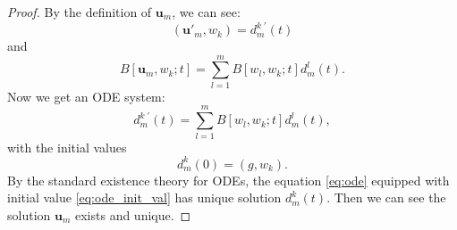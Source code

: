 \begin{proof}
    By the definition of $\mathbf{u}_{m}$, we can see:
    \begin{equation}
        \label{eq:ode_left}
        (\mathbf{u}'_{m},w_{k})=d_{m}^{k\;'}(t)
    \end{equation}
    and 
    \begin{equation}
        \label{eq:ode_right}
        B[\mathbf{u}_{m},w_{k};t]=\sum_{l=1}^{m}B[w_{l},w_{k};t]d_{m}^{l}(t).
    \end{equation}
    Now we get an ODE system:
    \begin{equation}
        \label{eq:ode}
        d_{m}^{k\;'}(t)=\sum_{l=1}^{m}B[w_{l},w_{k};t]d_{m}^{l}(t),
    \end{equation}
    with the initial values
    \begin{equation}
        \label{eq:ode_init_val}
        d_{m}^{k}(0)=(g,w_{k}).
    \end{equation}
    By the standard existence theory for ODEs, the equation \eqref{eq:ode} equipped with initial value \eqref{eq:ode_init_val} has unique solution $d_{m}^{k}(t)$. Then we can see the solution $\mathbf{u}_{m}$ exists and unique.
\end{proof}
